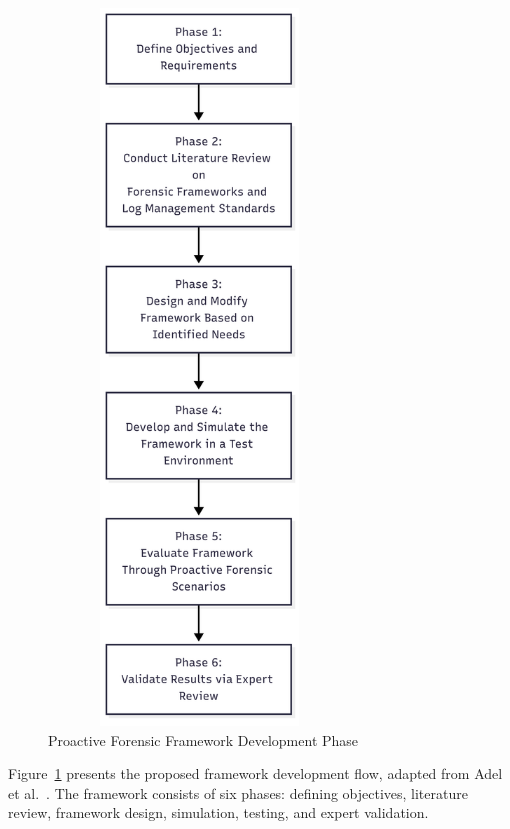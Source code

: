 
\begin{figure}[H]
    \centering
    \includegraphics[width=8cm,height=19cm]{figure/framework-development.png}
    \caption{Proactive Forensic Framework Development Phase \citet{adel2024ethicore}}
    \label{fig:framework-development-phase}
\end{figure}

Figure~\ref{fig:framework-development-phase} presents the proposed framework development flow, adapted from Adel et al.~\cite{adel2024ethicore}. The framework consists of six phases: defining objectives, literature review, framework design, simulation, testing, and expert validation. 

